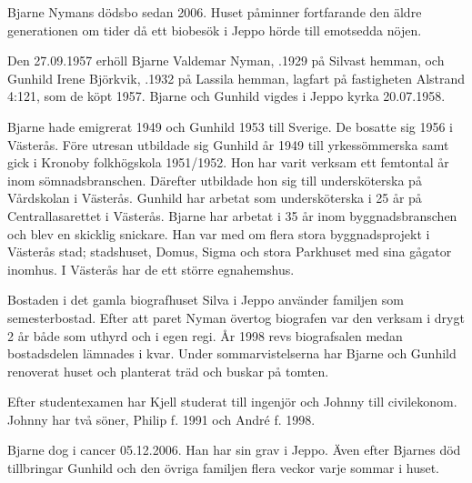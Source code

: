 

Bjarne Nymans dödsbo sedan 2006. Huset påminner fortfarande den äldre generationen om tider då ett biobesök i Jeppo hörde till emotsedda nöjen.\jhvspace{}


Den 27.09.1957 erhöll Bjarne Valdemar Nyman, .1929 på Silvast hemman, och Gunhild Irene Björkvik, .1932 på Lassila hemman, lagfart på fastigheten Alstrand 4:121, som de köpt 1957. Bjarne och Gunhild vigdes i Jeppo kyrka 20.07.1958.

Bjarne	hade emigrerat 1949 och Gunhild 1953 till Sverige. De	bosatte sig 1956 i Västerås. Före utresan utbildade sig Gunhild år 1949 till yrkessömmerska samt gick i Kronoby folkhögskola 1951/1952. Hon har varit verksam ett femtontal år inom sömnadsbranschen. Därefter utbildade hon sig till	undersköterska på Vårdskolan i Västerås. Gunhild har arbetat som undersköterska i 25 år på Centrallasarettet i	Västerås. Bjarne har arbetat i 35 år inom byggnadsbranschen	och blev en skicklig snickare. Han var med om flera stora	byggnadsprojekt i Västerås stad; stadshuset, Domus, Sigma	och stora Parkhuset med sina gågator inomhus. I Västerås har de ett större egnahemshus.


Bostaden i det gamla biografhuset Silva i Jeppo använder familjen som semesterbostad. Efter att paret Nyman övertog		biografen var den verksam i drygt 2 år både som uthyrd och i egen regi. År 1998 revs biografsalen medan bostadsdelen lämnades i kvar. Under sommarvistelserna har Bjarne och Gunhild renoverat huset och planterat träd och buskar på tomten.
\begin{jhchildren}
  \item {}
  \item {}
\end{jhchildren}
Efter studentexamen har Kjell studerat till ingenjör och Johnny till civilekonom. Johnny har två söner, Philip f. 1991 och André f. 1998.

Bjarne dog i cancer 05.12.2006. Han har sin grav i Jeppo. Även efter Bjarnes död tillbringar Gunhild och den övriga familjen flera veckor varje sommar i huset.


